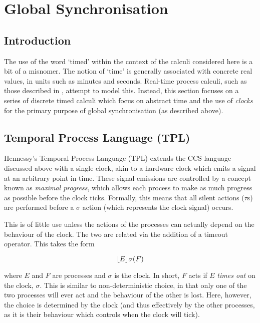 
\chapter{Global Synchronisation}
\label{globsync}

\section{Introduction}
\label{timing}

The use of the word `timed' within the context of the calculi
considered here is a bit of a misnomer.  The notion of `time' is
generally associated with concrete real values, in units such as
minutes and seconds.  Real-time process calculi, such as those
described in \cite{aceto:timing, beaten:timing, brics:lee,
  lee:realtime, tccs, satoh:phd, satoh:distrib}, attempt to model
this.  Instead, this section focuses on a series of discrete timed
calculi which focus on abstract time and the use of \emph{clocks} for
the primary purpose of global synchronisation (as described above).

\section{Temporal Process Language (TPL)}
\label{tpl}

Hennessy's Temporal Process Language (TPL) \cite{hennessy:tpl} extends
the CCS language discussed above with a single clock, akin to a
hardware clock which emits a signal at an arbitrary point in time.
These signal emissions are controlled by a concept known as
\emph{maximal progress}, which allows each process to make as much
progress as possible before the clock ticks.  Formally, this means
that all silent actions ($\tau$s) are performed before a $\sigma$
action (which represents the clock signal) occurs.

This is of little use unless the actions of the processes can actually
depend on the behaviour of the clock.  The two are related via the
addition of a timeout operator.  This takes the form

\begin{equation}
\lfloor{E}\rfloor {\sigma} ({F})
\end{equation}

\noindent where $E$ and $F$ are processes and $\sigma$ is the clock.  In
short, $F$ acts if $E$ \emph{times out} on the clock, $\sigma$.  This is
similar to non-deterministic choice, in that only one of the two
processes will ever act and the behaviour of the other is lost.  Here,
however, the choice is determined by the clock (and thus effectively by
the other processes, as it is their behaviour which controls when the
clock will tick).

